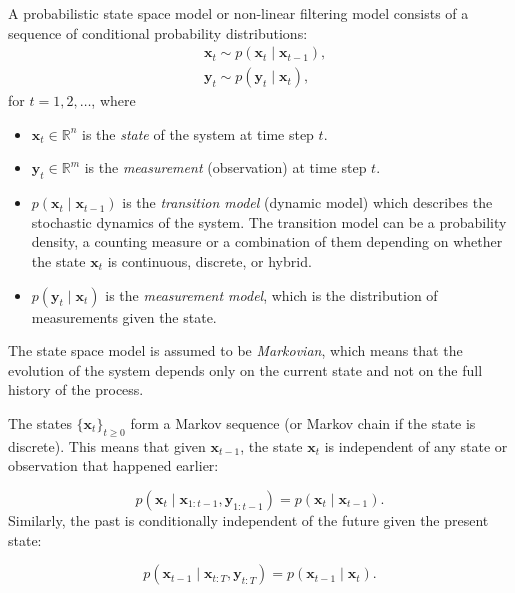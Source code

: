 \begin{definition}\label{def:ssm}
A probabilistic state space model or non-linear filtering model consists of a sequence of conditional probability distributions: 
\begin{align}
    &\mathbf{x}_t \sim p(\mathbf{x}_t \mid \mathbf{x}_{t-1}), \nonumber \\
    &\mathbf{y}_t \sim p(\mathbf{y}_t \mid \mathbf{x}_t),
\end{align}
for $t=1,2, \dots$, where 
\begin{itemize}
    \item[(i)] $\mathbf{x}_t \in \mathbb{R}^n$ is the \textit{state} of the system at time step $t$.
    \item[(ii)] $\mathbf{y}_t \in \mathbb{R}^m$ is the \textit{measurement} (observation) at time step $t$. 
    \item[(iii)] $p(\mathbf{x}_t\mid \mathbf{x}_{t-1})$ is the \textit{transition model} (dynamic model) which describes the stochastic dynamics of the system. The transition model can be a probability density, a counting measure or a combination of them depending on whether the state $\mathbf{x}_t$ is continuous, discrete, or hybrid. 
    \item[(iv)] $p(\mathbf{y}_t\mid \mathbf{x}_t)$ is the \textit{measurement model}, which is the distribution of measurements given the state. 
\end{itemize}
%
The state space model is assumed to be \textit{Markovian}, which means that the evolution of the system depends only on the current state and not on the full history of the process.
\end{definition}

\begin{property}
The states $\{\mathbf{x}_t\}_{t\geq0}$ form a Markov sequence (or Markov chain if the state is discrete). This means that given $\mathbf{x}_{t-1}$, the state $\mathbf{x}_t$ is independent of any state or observation that happened earlier: 

\begin{equation}\label{prop: Markov property of states}
   p(\mathbf{x}_t\mid \mathbf{x}_{1:t-1},\mathbf{y}_{1:t-1} )=  p(\mathbf{x}_t\mid \mathbf{x}_{t-1}).
\end{equation}
%
Similarly, the past is conditionally independent of the future given the present state: 

\begin{equation}
   p(\mathbf{x}_{t-1}\mid \mathbf{x}_{t:T},\mathbf{y}_{t:T} )=  p(\mathbf{x}_{t-1}\mid \mathbf{x}_t).
\end{equation}
\end{property}

